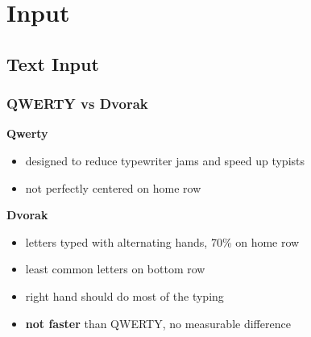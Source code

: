 \documentclass[]{article}
\theoremstyle{definition}
\begin{document}
	\section{Input}
	\subsection{Text Input}
	\subsubsection{QWERTY vs Dvorak}
	\textbf{Qwerty}
	\begin{itemize}
		\item designed to reduce typewriter jams and speed up typists
		\item not perfectly centered on home row
	\end{itemize}
	\textbf{Dvorak}
	\begin{itemize}
		\item letters typed with alternating hands, 70\% on home row
		\item least common letters on bottom row
		\item right hand should do most of the typing
		\item \textbf{not faster} than QWERTY, no measurable difference
	\end{itemize}
\end{document}
